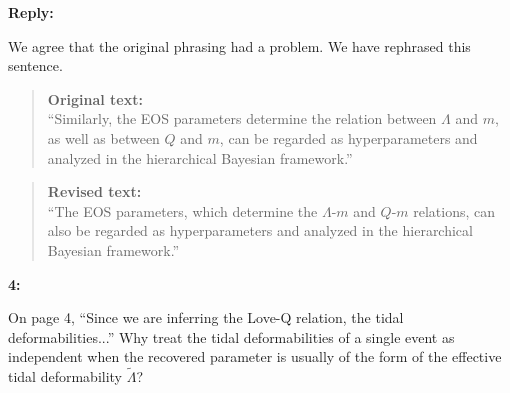 \documentclass[11pt]{article}
\newenvironment{reviewercomment}[1]{
    \vspace{1em}
    \noindent \textbf{#1:} \itshape
}{
    \par\vspace{0.5em}
}
\newenvironment{authorresponse}{
    \noindent \textbf{Reply:} \normalfont
}{
    \par\vspace{1.5em}
}
\newenvironment{originaltext}{
    \begin{quote}
    \color{oldcolor} \small \textbf{Original text:} \\
}{
    \end{quote}
}
\newenvironment{revisedtext}{
    \begin{quote}
    \color{revcolor} \small \textbf{Revised text:} \\
}{
    \end{quote}
}
\begin{document}
\begin{authorresponse}
    We agree that the original phrasing had a problem. We have rephrased this sentence.

    \begin{originaltext}
        ``Similarly, the EOS parameters determine the relation between $\Lambda$ and $m$,
        as well as between $Q$ and $m$, can be regarded as hyperparameters and analyzed
        in the hierarchical Bayesian framework.'' 
    \end{originaltext}
    
    \begin{revisedtext}
        ``The EOS parameters, which determine the $\Lambda$-$m$ and $Q$-$m$ relations,
        can also be regarded as hyperparameters and analyzed in the hierarchical Bayesian framework.''
    \end{revisedtext}
\end{authorresponse}


\begin{reviewercomment}{4}
    On page 4, ``Since we are inferring the Love-Q relation, the tidal deformabilities...'' Why treat the tidal deformabilities of a single event as independent when the recovered parameter is usually of the form of the effective tidal deformability $\tilde{\Lambda}$?
\end{reviewercomment}
\end{document}
